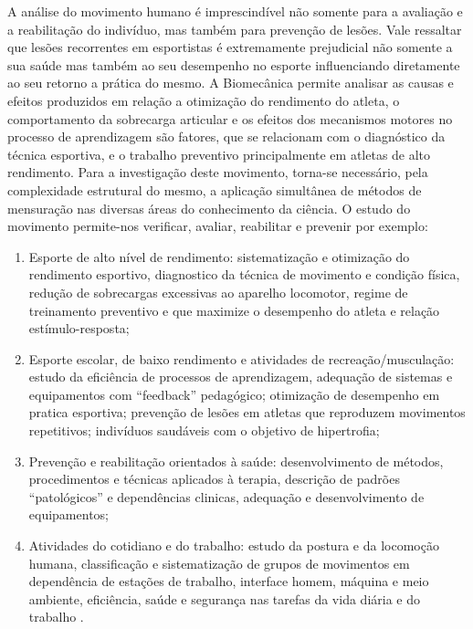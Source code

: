 A análise do movimento humano é imprescindível não somente para a avaliação e a
reabilitação do indivíduo, mas também para prevenção de lesões. Vale ressaltar que
lesões recorrentes em esportistas é extremamente prejudicial não somente a sua saúde
mas também ao seu desempenho no esporte influenciando diretamente ao seu retorno a
prática do mesmo. A Biomecânica  permite analisar as causas e efeitos
produzidos em relação a otimização do rendimento do atleta, o comportamento da
sobrecarga articular e os efeitos dos mecanismos motores no processo de aprendizagem
são fatores, que se relacionam com o diagnóstico da técnica esportiva, e o trabalho
preventivo principalmente em atletas de alto rendimento. Para a investigação deste
movimento, torna-se necessário, pela complexidade estrutural do mesmo, a aplicação
simultânea de métodos de mensuração nas diversas áreas do conhecimento da ciência. O
estudo do movimento permite-nos verificar, avaliar, reabilitar e prevenir por exemplo:
  \begin{enumerate}
  \item Esporte de alto nível de rendimento: sistematização e otimização do rendimento
  esportivo, diagnostico da técnica de movimento e condição física, redução de
  sobrecargas excessivas ao aparelho locomotor, regime de treinamento preventivo e que
  maximize o desempenho do atleta e relação estímulo-resposta;
  \item Esporte escolar, de baixo rendimento e atividades de recreação/musculação: estudo
  da eficiência de processos de aprendizagem, adequação de sistemas e equipamentos
  com “feedback” pedagógico; otimização de desempenho em pratica esportiva;
  prevenção de lesões em atletas que reproduzem movimentos repetitivos; indivíduos
  saudáveis com o objetivo de hipertrofia;
  \item Prevenção e reabilitação orientados à saúde: desenvolvimento de métodos,
  procedimentos e técnicas aplicados à terapia, descrição de padrões “patológicos” e
  dependências clinicas, adequação e desenvolvimento de equipamentos;
  \item Atividades do cotidiano e do trabalho: estudo da postura e da locomoção humana,
  classificação e sistematização de grupos de movimentos em dependência de estações de
  trabalho, interface homem, máquina e meio ambiente, eficiência, saúde e segurança nas
  tarefas da vida diária e do trabalho \cite{contextBiomecanica}.
  \end{enumerate}

